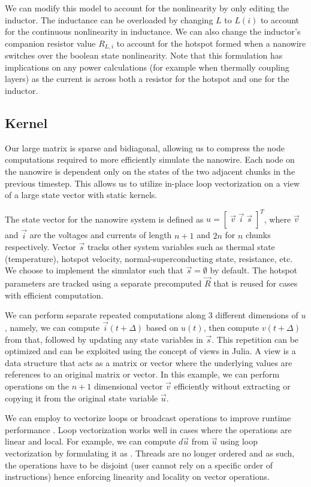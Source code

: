We can modify this model to account for the nonlinearity by only editing the inductor.
The inductance can be overloaded by changing $L$ to $L(i)$ to account for the continuous 
nonlinearity in inductance. We can also change the inductor's companion resistor value $R_{L, i}$
to account for the hotspot formed when a nanowire switches over the boolean state nonlinearity.
Note that this formulation has implications on any power calculations (for example
when thermally coupling layers) as the current is across both a resistor for the hotspot
and one for the inductor.

\subsection{Kernel}

Our large matrix is sparse and bidiagonal, allowing us to compress the node computations required
to more efficiently simulate the nanowire. Each node on the nanowire is dependent only on the states
of the two adjacent chunks in the previous timestep. This allows us to utilize in-place
loop vectorization on a view of a large state vector with static kernels.

The state vector for the nanowire system is defined as $u = [\; \vec v\; \vec i\; \vec s \;]^T$,
where $\vec v$ and $\vec i$ are the voltages and currents of length $n+1$ and $2n$ for $n$ chunks
respectively. Vector $\vec s$ tracks other system variables such as thermal state (temperature),
hotspot velocity,
normal-superconducting state, resistance, etc. We choose to implement the simulator such that $\vec s = \emptyset$
by default. The hotspot parameters are tracked using a separate precomputed $\vec R$ that is reused for
cases with efficient computation.

We can perform separate repeated computations along 3 different dimensions of $u$, namely, we can
compute $\vec i(t+\Delta)$ based on $u(t)$, then compute $v(t+\Delta)$ from that, followed by
updating any state variables in $\vec s$. This repetition can be optimized and can be exploited using
the concept of views in Julia. A view is a data structure that acts as a matrix or vector where the
underlying values are references to an original matrix or vector. In this example, we can perform
operations on the $n+1$ dimensional vector $\vec v$ efficiently without extracting or copying it from 
the original state variable $\vec u$. 

We can employ  to vectorize  loops or broadcast operations
to improve runtime performance \cite{julia_loop_vectorization}. 
Loop vectorization
works well in cases where the operations are linear and local. For
example, we can compute $d\vec u$ from $\vec u$ using loop vectorization by formulating
it as . Threads are no longer ordered
and as such, the operations have to be disjoint (user cannot rely on a specific order of
instructions) hence enforcing linearity and locality on vector operations.

